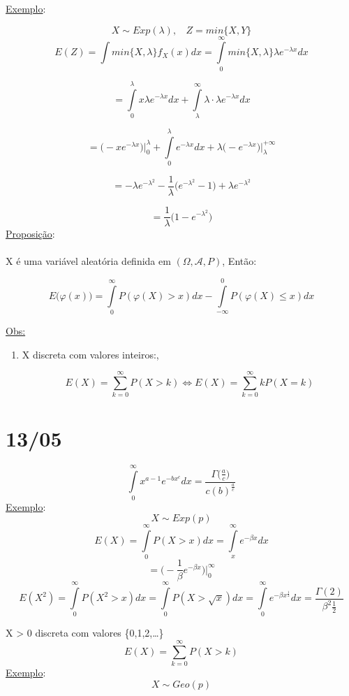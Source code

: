 \documentclass[a4paper,12pt]{article}
\begin{document}
\newpage 

\underline{Exemplo}:

$$X\sim Exp(\lambda), \ \ \ \ Z=min\{X,Y\} $$
$$E(Z)=\int min\{X,\lambda\}f_X(x)dx 
= \int\limits_{0}^{\infty} min\{X,\lambda\}\lambda e^{-\lambda x}dx
$$

$$= \int\limits_{0}^{\lambda}x\lambda e^{-\lambda x}dx +
\int\limits_{\lambda}^{\infty} \lambda\cdot \lambda e^{-\lambda x}dx
$$

$$
= \bigg(-xe^{-\lambda x} \bigg)\bigg|_0^\lambda + \int\limits_0^\lambda e^{-\lambda x}dx +\lambda \bigg(
-e^{-\lambda x}
\bigg)\bigg|_\lambda^{+\infty}
$$

$$
= -\lambda e^{-\lambda^2} - \frac{1}{\lambda}\bigg(e^{-\lambda^2}-1\bigg) + \lambda e^{-\lambda^2} 
$$

$$
=\frac{1}{\lambda}\bigg(1-e^{-\lambda^2}\bigg)
$$
\underline{Proposição}:\\
\\
X é uma variável aleatória definida em $(\Omega,\mathscr{A},P)$, Então:

$$E\bigg(\varphi(x)\bigg) = \int\limits_0^\infty P(\varphi(X)>x)dx- \int\limits_{-\infty }^0 P(\varphi(X)\le x)dx $$

\underline{Obs:}

\begin{enumerate}[label=\arabic*)]
	\item  X discreta com valores inteiros:,
	
	$$E(X) = \sum\limits_{k=0}^{\infty} P(X>k) \Leftrightarrow E(X) =
	 \sum\limits_{k=0}^{\infty} kP(X=k) 
	$$
	
	
\end{enumerate}
\newpage
\section{13/05}
$$\int\limits_{0}^{\infty} x^{a-1} e^{-bx^c}dx = \frac{\Gamma\bigg(\frac{a}{c}\bigg)}{c(b)^{\frac{a}{c}}} $$
\underline{Exemplo}:
$$X\sim Exp(p) $$
$$E(X) = \int\limits_{0}^{\infty} P(X>x)dx  = \int\limits_x^{\infty} e^{-\beta x}dx$$
$$=\bigg(
-\frac{1}{\beta} e^{-\beta x}
\bigg)\bigg|_{0}^{\infty} $$
$$E(X^2) = \int\limits_0^\infty P(X^2>x)dx
=
\int\limits_0^\infty P(X>\sqrt x)dx
=
\int\limits_0^\infty e^{-\beta x^{\frac{1}{2}}}dx 
 = \frac{\Gamma(2)}{\beta^2\frac{1}{2}} 
 $$

X > 0 discreta com valores \{0,1,2,\ldots\}
$$E(X) = \sum\limits_{k=0}^{\infty} P(X>k) $$
\underline{Exemplo}:
$$X\sim Geo(p) $$
\end{document}
